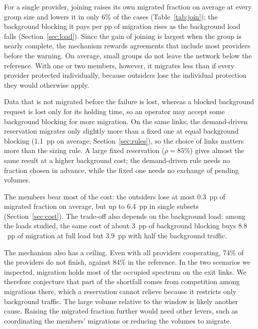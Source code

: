 \documentclass[11pt,a4paper]{article}
\theoremstyle{definition}
\begin{document}
For a single provider, joining raises its own migrated fraction on average at every group size and lowers it in only 6\% of the cases (Table~\ref{tab:join}); the background blocking it pays per pp of migration rises as the background load falls (Section~\ref{sec:load}).
Since the gain of joining is largest when the group is nearly complete, the mechanism rewards agreements that include most providers before the warning.
On average, small groups do not leave the network below the reference. With one or two members, however, it migrates less than if every provider protected individually, because outsiders lose the individual protection they would otherwise apply.

Data that is not migrated before the failure is lost, whereas a blocked background request is lost only for its holding time, so an operator may accept some background blocking for more migration.
On the same links, the demand-driven reservation migrates only slightly more than a fixed one at equal background blocking (1.1~pp on average; Section~\ref{sec:rules}), so the choice of links matters more than the sizing rule.
A large fixed reservation ($\rho=85\%$) gives almost the same result at a higher background cost; the demand-driven rule needs no fraction chosen in advance, while the fixed one needs no exchange of pending volumes.

The members bear most of the cost: the outsiders lose at most $0.3$~pp of migrated fraction on average, but up to $6.4$~pp in single subsets (Section~\ref{sec:cost}).
The trade-off also depends on the background load: among the loads studied, the same cost of about $3$~pp of background blocking buys $8.8$~pp of migration at full load but $3.9$~pp with half the background traffic.

The mechanism also has a ceiling.
Even with all providers cooperating, 74\% of the providers do not finish, against 84\% in the reference.
In the two scenarios we inspected, migration holds most of the occupied spectrum on the exit links. We therefore conjecture that part of the shortfall comes from competition among migrations there, which a reservation cannot relieve because it restricts only background traffic. The large volume relative to the window is likely another cause.
Raising the migrated fraction further would need other levers, such as coordinating the members' migrations or reducing the volumes to migrate.
\end{document}
